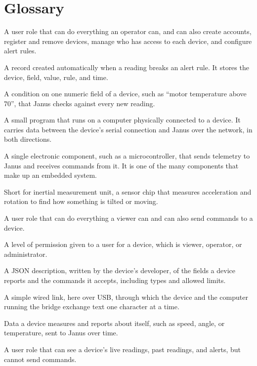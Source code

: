 \documentclass[11pt]{article}
\begin{document}
\section{Glossary}

\begin{description}[leftmargin=0pt, style=standard, itemsep=0.4em]
\item[Administrator:] A user role that can do everything an operator can, and can also create accounts, register and remove devices, manage who has access to each device, and configure alert rules.
\item[Alert:] A record created automatically when a reading breaks an alert rule. It stores the device, field, value, rule, and time.
\item[Alert rule:] A condition on one numeric field of a device, such as ``motor temperature above 70'', that Janus checks against every new reading.
\item[Bridge:] A small program that runs on a computer physically connected to a device. It carries data between the device's serial connection and Janus over the network, in both directions.
\item[Device:] A single electronic component, such as a microcontroller, that sends telemetry to Janus and receives commands from it. It is one of the many components that make up an embedded system.
\item[IMU:] Short for inertial measurement unit, a sensor chip that measures acceleration and rotation to find how something is tilted or moving.
\item[Operator:] A user role that can do everything a viewer can and can also send commands to a device.
\item[Role:] A level of permission given to a user for a device, which is viewer, operator, or administrator.
\item[Schema:] A JSON description, written by the device's developer, of the fields a device reports and the commands it accepts, including types and allowed limits.
\item[Serial connection:] A simple wired link, here over USB, through which the device and the computer running the bridge exchange text one character at a time.
\item[Telemetry:] Data a device measures and reports about itself, such as speed, angle, or temperature, sent to Janus over time.
\item[Viewer:] A user role that can see a device's live readings, past readings, and alerts, but cannot send commands.
\end{description}
\end{document}
